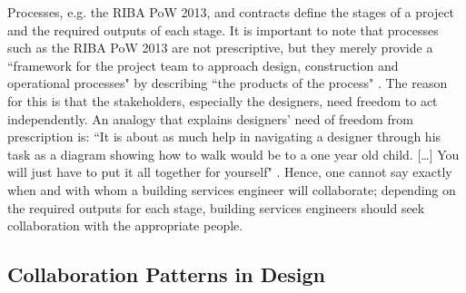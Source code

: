 Processes, e.g. the RIBA PoW 2013, and contracts define the stages of a project and the required outputs of each stage.
It is important to note that processes such as the RIBA PoW 2013 are not prescriptive, but they merely provide a ``framework for the project team to approach design, construction and operational processes" \citep{Fairhead2015:online} by describing ``the products of the process" \citep{lawson1990}. %
The reason for this is that the stakeholders, especially the designers, need freedom to act independently.
An analogy that explains designers' need of freedom from prescription is:
``It is about as much help in navigating a designer through his task as a diagram showing how to walk would be to a one year old child. [\ldots] You will just have to put it all together for yourself" \citep[p.~28]{lawson1990}.
Hence, one cannot say exactly when and with whom a building services engineer will collaborate; depending on the required outputs for each stage, building services engineers should seek collaboration with the appropriate people.



\subsection{Collaboration Patterns in Design}

